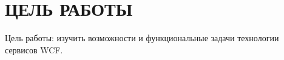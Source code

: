 \section{ЦЕЛЬ РАБОТЫ}

Цель работы: изучить возможности и функциональные задачи технологии
сервисов WCF.

\newpage
